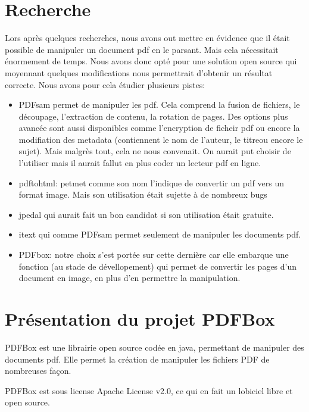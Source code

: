    \section{Recherche}
    Lors après quelques recherches, nous avons out mettre en évidence que il était 
    possible de manipuler un document pdf en le parsant. Mais cela nécessitait 
    énormement de temps. Nous avons donc opté pour une solution open source
    qui moyennant quelques modifications nous permettrait d'obtenir un résultat
    correcte.
    Nous avons pour cela étudier plusieurs pistes:
    \begin{itemize}
    \item PDFsam permet de manipuler les pdf. Cela comprend la fusion de 
     fichiers, le découpage, l'extraction de contenu, la rotation de pages.
     Des options plus avancée sont aussi disponibles comme l'encryption de ficheir
     pdf ou encore  la modifiation des metadata (contiennent le nom de l'auteur,
     le titreou encore le sujet). Mais malgrès tout, cela ne nous convenait.
     On aurait put choisir de l'utiliser mais il aurait fallut en plus coder un lecteur 
     pdf en ligne.
     \item pdftohtml: petmet comme son nom l'indique de convertir un pdf 
     vers un format image. Mais son utilisation était sujette à de nombreux bugs
     \item jpedal qui aurait fait un bon candidat si son utilisation était gratuite.
     \item itext qui comme PDFsam permet seulement de manipuler les 
     documents pdf.
     \item PDFbox: notre choix s'est portée sur cette dernière car elle embarque une 
     fonction (au stade de dévellopement) qui permet de convertir les pages d'un
     document en image, en plus d'en permettre la manipulation.
    \end{itemize}

    \section{Présentation du projet PDFBox}
    PDFBox est une librairie open source codée en java, permettant de manipuler 
    des documents pdf. Elle permet la création de manipuler les fichiers PDF de 
    nombreuses façon.

    PDFBox est sous license Apache License v2.0, ce qui en fait un lobiciel libre 
    et open source.

